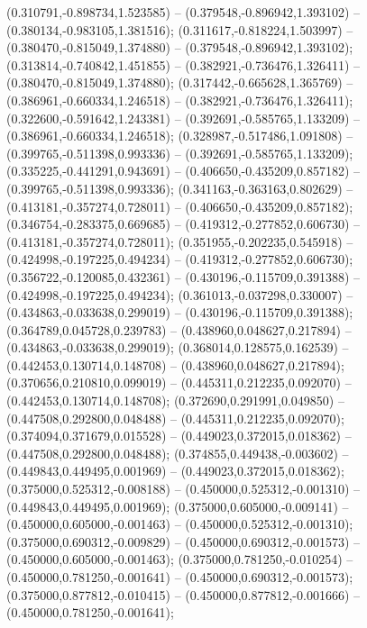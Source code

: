  (0.310791,-0.898734,1.523585) -- (0.379548,-0.896942,1.393102) -- (0.380134,-0.983105,1.381516);
 (0.311617,-0.818224,1.503997) -- (0.380470,-0.815049,1.374880) -- (0.379548,-0.896942,1.393102);
 (0.313814,-0.740842,1.451855) -- (0.382921,-0.736476,1.326411) -- (0.380470,-0.815049,1.374880);
 (0.317442,-0.665628,1.365769) -- (0.386961,-0.660334,1.246518) -- (0.382921,-0.736476,1.326411);
 (0.322600,-0.591642,1.243381) -- (0.392691,-0.585765,1.133209) -- (0.386961,-0.660334,1.246518);
 (0.328987,-0.517486,1.091808) -- (0.399765,-0.511398,0.993336) -- (0.392691,-0.585765,1.133209);
 (0.335225,-0.441291,0.943691) -- (0.406650,-0.435209,0.857182) -- (0.399765,-0.511398,0.993336);
 (0.341163,-0.363163,0.802629) -- (0.413181,-0.357274,0.728011) -- (0.406650,-0.435209,0.857182);
 (0.346754,-0.283375,0.669685) -- (0.419312,-0.277852,0.606730) -- (0.413181,-0.357274,0.728011);
 (0.351955,-0.202235,0.545918) -- (0.424998,-0.197225,0.494234) -- (0.419312,-0.277852,0.606730);
 (0.356722,-0.120085,0.432361) -- (0.430196,-0.115709,0.391388) -- (0.424998,-0.197225,0.494234);
 (0.361013,-0.037298,0.330007) -- (0.434863,-0.033638,0.299019) -- (0.430196,-0.115709,0.391388);
 (0.364789,0.045728,0.239783) -- (0.438960,0.048627,0.217894) -- (0.434863,-0.033638,0.299019);
 (0.368014,0.128575,0.162539) -- (0.442453,0.130714,0.148708) -- (0.438960,0.048627,0.217894);
 (0.370656,0.210810,0.099019) -- (0.445311,0.212235,0.092070) -- (0.442453,0.130714,0.148708);
 (0.372690,0.291991,0.049850) -- (0.447508,0.292800,0.048488) -- (0.445311,0.212235,0.092070);
 (0.374094,0.371679,0.015528) -- (0.449023,0.372015,0.018362) -- (0.447508,0.292800,0.048488);
 (0.374855,0.449438,-0.003602) -- (0.449843,0.449495,0.001969) -- (0.449023,0.372015,0.018362);
 (0.375000,0.525312,-0.008188) -- (0.450000,0.525312,-0.001310) -- (0.449843,0.449495,0.001969);
 (0.375000,0.605000,-0.009141) -- (0.450000,0.605000,-0.001463) -- (0.450000,0.525312,-0.001310);
 (0.375000,0.690312,-0.009829) -- (0.450000,0.690312,-0.001573) -- (0.450000,0.605000,-0.001463);
 (0.375000,0.781250,-0.010254) -- (0.450000,0.781250,-0.001641) -- (0.450000,0.690312,-0.001573);
 (0.375000,0.877812,-0.010415) -- (0.450000,0.877812,-0.001666) -- (0.450000,0.781250,-0.001641);
